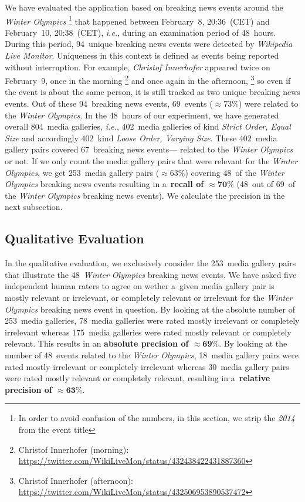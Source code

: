\documentclass{sig-alternate}
\newcommand{\inlinelistingsize}{\fontsize{8pt}{11pt}}
\let\oldurl\url
\renewcommand{\url}[1]{\inlinelistingsize\oldurl{#1}}
\begin{document}
We have evaluated the application based on breaking news events
around the \emph{Winter Olympics}%
\footnote{In order to avoid confusion of the numbers,
in this section, we strip the \emph{2014} from the event title}
that happened between February~8, 20:36~(CET) and February~10, 20:38~(CET),
\emph{i.e.}, during an examination period of 48~hours.
During this period, 94~unique breaking news events
were detected by \emph{Wikipedia Live Monitor}.
Uniqueness in this context is defined as events being
reported without interruption.
For example, \emph{Christof Innerhofer} appeared twice on February~9,
once in the morning%
\footnote{Christof Innerhofer (morning):
\url{https://twitter.com/WikiLiveMon/status/432438422431887360}}
and once again in the afternoon,%
\footnote{Christof Innerhofer (afternoon):
\url{https://twitter.com/WikiLiveMon/status/432506953890537472}}
so even if the event is about the same person,
it is still tracked as two unique breaking news events.
Out of these 94~breaking news events,
69~events (${\approx}73\%$) were
related to the \emph{Winter Olympics}.
In the 48~hours of our experiment,
we have generated overall 804~media galleries,
\emph{i.e.}, 402~media galleries of kind \emph{Strict Order, Equal Size}
and accordingly 402~kind \emph{Loose Order, Varying Size}.
These 402~media gallery pairs covered 67~breaking news events---%
related to the \emph{Winter Olympics} or not.
If we only count the media gallery pairs that were relevant
for the \emph{Winter Olympics},
we get 253~media gallery pairs (${\approx}63\%$)
covering 48~of the \emph{Winter Olympics} breaking news events
resulting in a~\textbf{recall of $\mathbf{{\approx}70\%}$}
(48~out of 69~of the \emph{Winter Olympics} breaking news events).
We calculate the precision in the next subsection.

\subsection{Qualitative Evaluation}

In the qualitative evaluation, we exclusively consider the 
253~media gallery pairs that illustrate the
48~\emph{Winter Olympics} breaking news events.
We have asked five independent human raters to agree on
wether a~given media gallery pair is mostly relevant or irrelevant,
or completely relevant or irrelevant for the 
\emph{Winter Olympics} breaking news event in question.
By looking at the absolute number of 253~media galleries,
78~media galleries were rated mostly irrelevant
or completely irrelevant
whereas 175~media galleries were rated mostly relevant
or completely relevant.
This results in an \textbf{absolute precision of $\mathbf{{\approx}69\%}$}.
By looking at the number of 48~events related to the \emph{Winter Olympics},
18~media gallery pairs were rated mostly irrelevant
or completely irrelevant
whereas 30~media gallery pairs were rated mostly relevant
or completely relevant, resulting in
a~\textbf{relative precision of $\mathbf{{\approx}63\%}$}.
\end{document}
